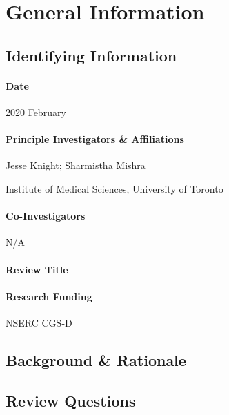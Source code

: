 \documentclass{article}
\begin{document}
\maketitle
\tableofcontents
\clearpage
\section{General Information}
\subsection{Identifying Information}
\paragraph{Date} 2020 February
\paragraph{Principle Investigators \& Affiliations}\n
Jesse Knight;
Sharmistha Mishra
\par
{}Institute of Medical Sciences, University of Toronto
\paragraph{Co-Investigators}
N/A
\paragraph{Review Title}\n
\textit{\reviewtitle}
\paragraph{Research Funding}
NSERC CGS-D
\subsection{Background \& Rationale}

\clearpage %
\subsection{Review Questions}
\label{ss:questions}

\end{document}

